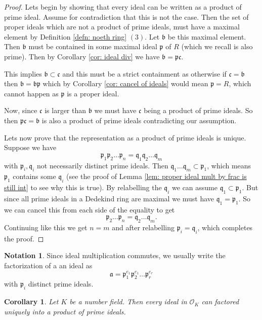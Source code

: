 \documentclass[11pt,a4paper]{report}
\theoremstyle{plain}
\newtheorem{cor}[subsection]{Corollary}
\theoremstyle{definition}
\theoremstyle{definition}
\newtheorem{nota}[subsection]{Notation}
\def\gothb{\mathfrak{b}}
\def\gothc{\mathfrak{c}}
\def\gothp{\mathfrak{p}}
\def\gothq{\mathfrak{q}}
\def \OO {\mathcal{O}}
\def\gotha{\mathfrak{a}}
\begin{document}
	\begin{proof}
		Lets begin by showing that every ideal can be written as a product of prime ideal. Assume for contradiction that this is not the case. Then the set of proper ideals which are not a product of prime ideals, must have a maximal element by Definition \ref{defn: noeth ring} $(3)$. Let $\gothb$ be this maximal element. Then $\gothb$ must be contained in some maximal ideal $\gothp$ of $R$ (which we recall is also prime). Then by Corollary \ref{cor: ideal div} we have $\gothb=\gothp \gothc$. 
		
		This implies $\gothb \subset \gothc$ and this must be a strict containment as otherwise if $\gothc=\gothb$ then $\gothb=\gothb\gothp$ which by Corollary \ref{cor: cancel of ideals}  would mean $\gothp=R$, which cannot happen as $\gothp$ is a proper ideal. 
		
		Now, since $\gothc$ is larger than $\gothb$ we must have $\gothc$ being a product of prime ideals. So then $\gothp\gothc=\gothb$ is also a product of prime ideals contradicting our assumption. 
		
		Lets now prove that the representation as a product of prime ideals is unique. Suppose we have \[\gothp_1\gothp_2\dots\gothp_n=\gothq_1\gothq_2\dots\gothq_m\] with $\gothp_i,\gothq_i$ not necessarily distinct prime ideals. Then $\gothq_1\dots\gothq_m  \subset \gothp_1$, which means $\gothp_1$ contains some $\gothq_i$  (see the proof of Lemma \ref{lem: proper ideal mult by frac is still int} to see why this is true). By relabelling the $\gothq_i$ we can assume $\gothq_1 \subset \gothp_1$. But since all prime ideals in a Dedekind ring are maximal we must have $\gothq_1=\gothp_1$. So we can cancel this from each side of the equality to get \[\gothp_2\dots\gothp_n=\gothq_2\dots\gothq_m.\] Continuing like this we get $n=m$ and after relabelling $\gothp_i=\gothq_i$, which completes the proof.
		
		
		
		
	\end{proof}
	
	\begin{nota}
		Since ideal multiplication commutes, we usually write the factorization of a an ideal as \[\gotha=\gothp_1^{e_1}\gothp_2^{e_1}\dots\gothp_r^{e_r}\] with $\gothp_i$ distinct prime ideals. 
	\end{nota}
	
	\begin{cor}
		Let $K$ be a number field. Then every ideal in $\OO_K$ can factored uniquely into a product of prime ideals.
	\end{cor}
	
\end{document}
